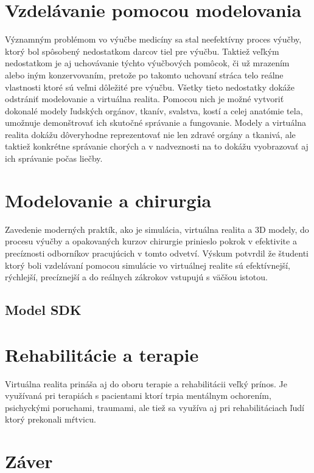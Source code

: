 \documentclass[10pt,twoside,slovak,a4paper]{article}
\begin{document}
\section{Vzdelávanie pomocou modelovania } \label{vzdelanie}
Významným problémom vo výučbe medicíny sa stal neefektívny proces výučby, ktorý bol spôsobený nedostatkom darcov tiel pre výučbu. Taktiež veľkým nedostatkom je aj uchovávanie týchto výučbových pomôcok, či už mrazením alebo iným konzervovaním, pretože po takomto uchovaní stráca telo reálne vlastnosti ktoré sú veľmi dôležité pre výučbu. Všetky tieto nedostatky dokáže odstrániť modelovanie a virtuálna realita. Pomocou nich je možné vytvoriť dokonalé modely ľudských orgánov, tkanív, svalstva, kostí a celej anatómie tela, umožnuje demonštrovať ich skutočné správanie a fungovanie. Modely a virtuálna realita dokážu dôveryhodne reprezentovať nie len zdravé orgány a tkanivá, ale taktiež konkrétne správanie chorých a v nadveznosti na to dokážu vyobrazovať aj ich správanie počas liečby. \cite{2016}   



\section{Modelovanie a chirurgia} \label{chirurgia}
Zavedenie moderných praktík, ako je simulácia, virtuálna realita a 3D modely, do procesu výučby a opakovaných kurzov chirurgie prinieslo pokrok v efektivite a precíznosti odborníkov pracujúcich v tomto odvetví. Výskum potvrdil že študenti ktorý boli vzdelávaní pomocou simulácie vo virtuálnej realite sú efektívnejší, rýchlejší, precíznejší a do reálnych zákrokov vstupujú s väčšou istotou. \cite{2016}  

\subsection{Model SDK} \label{SDK}

\section{Rehabilitácie a terapie} \label{rehab}
Virtuálna realita prináša aj do oboru terapie a rehabilitácii veľký prínos. Je využívaná pri terapiách s pacientami ktorí trpia mentálnym ochorením, psichyckými poruchami, traumami, ale tiež sa využíva aj pri rehabilitáciach ľudí ktorý prekonali mŕtvicu. \cite{2020}  

\section{Záver} \label{zaver} %




\end{document}
